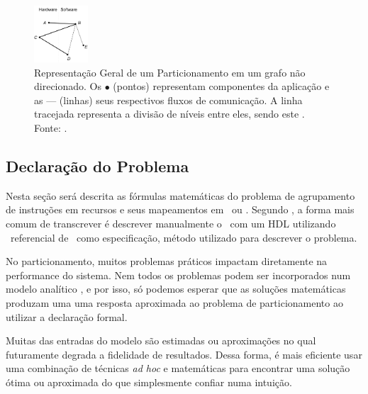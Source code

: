 	\begin{figure}[!b] \centering
		\includegraphics[width=0.18\textwidth]{img/partitioning.png}
		\caption{Representação Geral de um Particionamento em um grafo não direcionado. Os $\bullet$ (pontos) representam componentes da aplicação e as --- (linhas) seus respectivos fluxos de comunicação. A linha tracejada representa a divisão de níveis entre eles, sendo este \hs. Fonte: \cite{Mann2007}.}
		\label{fig:f4-4}
	\end{figure}


\subsection{Declaração do Problema}
	Nesta seção será descrita as fórmulas matemáticas do problema de agrupamento de instruções em recursos e seus mapeamentos em \hardware\ ou \software.
	Segundo \cite{Sass2010}, a forma mais comum de transcrever é descrever manualmente o \core\ com um HDL utilizando \design\ referencial de \software\ como especificação, método utilizado para descrever o problema.

	No particionamento, muitos problemas práticos impactam diretamente na performance do sistema.
    Nem todos os problemas podem ser incorporados num modelo analítico \cite{Wang2016}, e por isso, só podemos esperar que as soluções matemáticas produzam uma uma resposta aproximada ao problema de particionamento ao utilizar a declaração formal.

	Muitas das entradas do modelo são estimadas ou aproximações no qual futuramente degrada a fidelidade de resultados.
	Dessa forma, é mais eficiente usar uma combinação de técnicas \textit{ad hoc} e matemáticas para encontrar uma solução ótima ou aproximada do que simplesmente confiar numa intuição.


